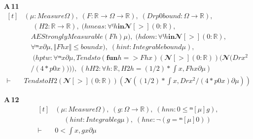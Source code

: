 \noindent\textbf{A\,11}\quad{}
{\footnotesize\[ \begin{aligned}[t]
&(\mu : \mathit{Measure} \Omega ),\; (\mathit{F} : \mathbb{R} \to \Omega \to \mathbb{R} ),\; (\mathit{Dr} \mathit{p0} \mathit{bound} : \Omega \to \mathbb{R} ),\\
&\quad \; (\mathit{H2} : \mathbb{R} \to \mathbb{R} ),\; (\mathit{hmeas} : \forall  ᶠ \mathit{h} \mathbf{in} 𝓝[>] (0:\mathbb{R} ),\\
&\quad \mathit{AEStronglyMeasurable} (\mathit{F} \mathit{h}) \mu ),\; (\mathit{hdom} : \forall  ᶠ \mathit{h} \mathbf{in} 𝓝[>] (0:\mathbb{R} ),\\
&\quad \forall  ᵐ \mathit{x} ∂\mu , \Vert \mathit{F} \mathit{h} \mathit{x}\Vert \leq \mathit{bound} \mathit{x}),\; (\mathit{hint} : \mathit{Integrable} \mathit{bound} \mu ),\\
&\quad \; (\mathit{hptw} : \forall  ᵐ \mathit{x} ∂\mu , \mathit{Tendsto} (\mathbf{fun} \mathit{h} => \mathit{F} \mathit{h} \mathit{x}) (𝓝[>] (0:\mathbb{R} )) (𝓝 (\mathit{Dr} \mathit{x} ^{2}\\
&\quad / (4 * \mathit{p0} \mathit{x})))),\; (\mathit{hH2} : \forall \mathit{h} : \mathbb{R} , \mathit{H2} \mathit{h} = (1/2) * \int \mathit{x}, \mathit{F} \mathit{h} \mathit{x} ∂\mu )\\
\vdash\;&\mathit{Tendsto} \mathit{H2} (𝓝[>] (0:\mathbb{R} )) (𝓝 ((1/2) * \int \mathit{x}, \mathit{Dr} \mathit{x} ^{2} / (4 * \mathit{p0} \mathit{x}) ∂\mu ))
\end{aligned} \]}

\noindent\textbf{A\,12}\quad{}
{\footnotesize\[ \begin{aligned}[t]
&(\mu : \mathit{Measure} \Omega ),\; (\mathit{g} : \Omega \to \mathbb{R} ),\; (\mathit{hnn} : 0 \leq  ᵐ[\mu ] \mathit{g}),\\
&\quad \; (\mathit{hint} : \mathit{Integrable} \mathit{g} \mu ),\; (\mathit{hne} : \neg (\mathit{g} =ᵐ[\mu ] 0))\\
\vdash\;&0 < \int \mathit{x}, \mathit{g} \mathit{x} ∂\mu
\end{aligned} \]}

